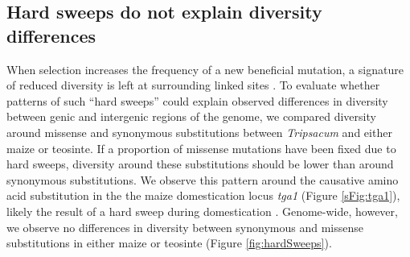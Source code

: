 \documentclass{pnastwo}
\newcommand{\mbh}[1]{\textcolor{blue}{\scriptsize #1}}
\begin{document}
\begin{article}
\subsection{Hard sweeps do not explain diversity differences} %
When selection increases the frequency of a new beneficial mutation, a signature of reduced diversity is left at surrounding linked sites \cite{smith1974}.
To evaluate whether patterns of such ``hard sweeps'' could explain observed differences in diversity between genic and intergenic regions of the genome, we compared diversity around missense and synonymous substitutions between \emph{Tripsacum} and either maize or teosinte.
If a proportion of missense mutations have been fixed due to hard sweeps, diversity around these substitutions should be lower than around synonymous substitutions. 
We observe this pattern around the causative amino acid substitution in the the maize domestication locus \emph{tga1} (Figure \ref{sFig:tga1}), likely the result of a hard sweep during domestication \cite{wang2005origin, wang2015}. Genome-wide, however, we observe no differences in diversity between synonymous and missense substitutions in either maize or teosinte (Figure \ref{fig:hardSweeps}).



\end{article}
\end{document}

